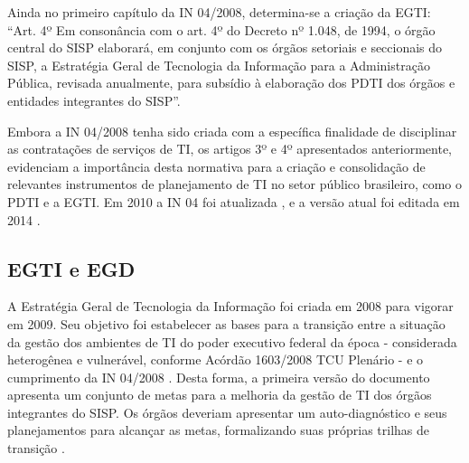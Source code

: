 Ainda no primeiro capítulo da IN 04/2008, determina-se a criação da EGTI: ``Art. 4º Em consonância com o art. 4º do Decreto nº 1.048, de 1994, o órgão central do SISP elaborará, em conjunto com os órgãos setoriais e seccionais do SISP, a Estratégia Geral de Tecnologia da Informação para a Administração Pública, revisada anualmente, para subsídio à elaboração dos PDTI dos órgãos e entidades integrantes do SISP''.

Embora a IN 04/2008 tenha sido criada com a específica finalidade de disciplinar as contratações de serviços de TI, os artigos 3º e 4º apresentados anteriormente, evidenciam a importância desta normativa para a criação e consolidação de relevantes instrumentos de planejamento de TI no setor público brasileiro, como o PDTI e a EGTI. Em 2010 a IN 04 foi atualizada \cite{in04:10}, e a versão atual foi editada em 2014 \cite{in04:14}.


\subsection{EGTI e EGD}
A Estratégia Geral de Tecnologia da Informação foi criada em 2008 para vigorar em 2009. Seu objetivo foi estabelecer as bases para a transição entre a situação da gestão dos ambientes de TI do poder executivo federal da época - considerada heterogênea e vulnerável, conforme Acórdão 1603/2008 TCU Plenário - e o cumprimento da IN 04/2008 \cite{egti:08}. Desta forma, a primeira versão do documento apresenta um conjunto de metas para a melhoria da gestão de TI dos órgãos integrantes do SISP. Os órgãos deveriam apresentar um auto-diagnóstico e seus planejamentos para alcançar as metas, formalizando suas próprias trilhas de transição \cite{douEGTI:08}.

